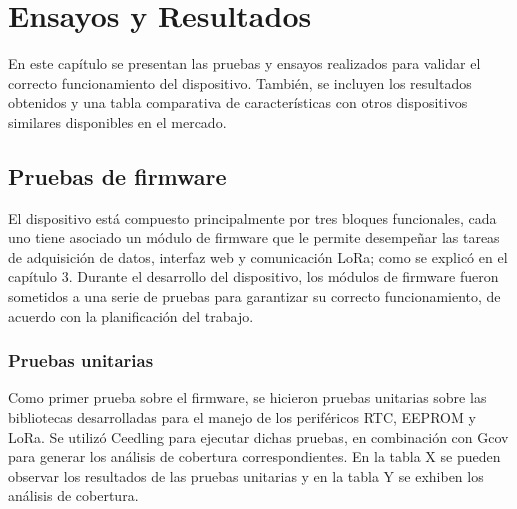 
\chapter{Ensayos y Resultados} %

\label{Chapter4} %



En este capítulo se presentan las pruebas y ensayos realizados para validar el correcto funcionamiento del dispositivo. También, se incluyen los resultados obtenidos y una tabla comparativa de características con otros dispositivos similares disponibles en el mercado.


\section{Pruebas de firmware}
\label{sec:pruebasFW}

El dispositivo está compuesto principalmente por tres bloques funcionales, cada uno tiene asociado un módulo de firmware que le permite desempeñar las tareas de adquisición de datos, interfaz web y comunicación LoRa; como se explicó en el capítulo 3. Durante el desarrollo del dispositivo, los módulos de firmware fueron sometidos a una serie de pruebas para garantizar su correcto funcionamiento, de acuerdo con la planificación del trabajo.

\subsection{Pruebas unitarias}

Como primer prueba sobre el firmware, se hicieron pruebas unitarias sobre las bibliotecas desarrolladas para el manejo de los periféricos RTC, EEPROM y LoRa. Se utilizó Ceedling para ejecutar dichas pruebas, en combinación con Gcov para generar los análisis de cobertura correspondientes. En la tabla X se pueden observar los resultados de las pruebas unitarias y en la tabla Y se exhiben los análisis de cobertura.

